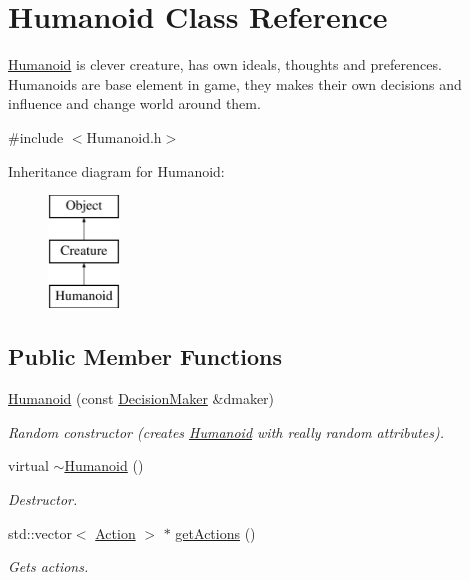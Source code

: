 \hypertarget{classHumanoid}{\section{Humanoid Class Reference}
\label{classHumanoid}
}


\hyperlink{classHumanoid}{Humanoid} is clever creature, has own ideals, thoughts and preferences. Humanoids are base element in game, they makes their own decisions and influence and change world around them.  




{\ttfamily \#include $<$Humanoid.\-h$>$}

Inheritance diagram for Humanoid\-:\begin{figure}[H]
\begin{center}
\leavevmode
\includegraphics[height=3.000000cm]{classHumanoid}
\end{center}
\end{figure}
\subsection*{Public Member Functions}
\begin{DoxyCompactItemize}
\item 
\hyperlink{classHumanoid_af3565e2c74410d3c411bc94224e5de29}{Humanoid} (const \hyperlink{classDecisionMaker}{Decision\-Maker} \&dmaker)
\begin{DoxyCompactList}\small\item\em Random constructor (creates \hyperlink{classHumanoid}{Humanoid} with really random attributes). \end{DoxyCompactList}\item 
virtual \hyperlink{classHumanoid_a72dbc95208cb84fc3a70691f310e61ee}{$\sim$\-Humanoid} ()
\begin{DoxyCompactList}\small\item\em Destructor. \end{DoxyCompactList}\item 
std\-::vector$<$ \hyperlink{classAction}{Action} $>$ $\ast$ \hyperlink{classHumanoid_a543dfc658e59e98f5194aa64dd2ae723}{get\-Actions} ()
\begin{DoxyCompactList}\small\item\em Gets actions. \end{DoxyCompactList}\end{DoxyCompactItemize}
